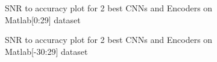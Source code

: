 \chapter{} \label{Appendix_C}


\begin{figure}[h!]
    \begin{center}
        
    \end{center}
    \caption{SNR to accuracy plot for 2 best CNNs and Encoders on Matlab[0:29] dataset}
    \label{fig:snr_to_acc_matlab_0_29}
\end{figure}

\begin{figure}[h!]
    \begin{center}
        
    \end{center}
    \caption{SNR to accuracy plot for 2 best CNNs and Encoders on Matlab[-30:29] dataset}
    \label{fig:snr_to_acc_matlab_-30_29}
\end{figure}